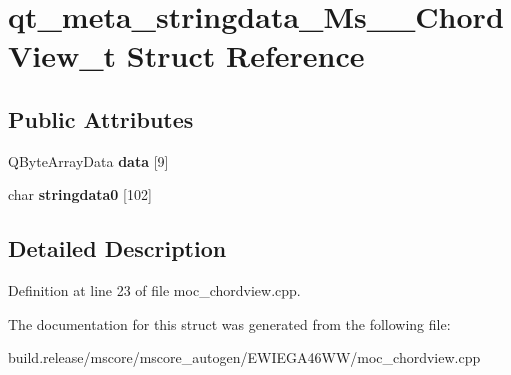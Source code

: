 \hypertarget{structqt__meta__stringdata___ms_____chord_view__t}{}\section{qt\+\_\+meta\+\_\+stringdata\+\_\+\+Ms\+\_\+\+\_\+\+Chord\+View\+\_\+t Struct Reference}
\label{structqt__meta__stringdata___ms_____chord_view__t}
\subsection*{Public Attributes}
\begin{DoxyCompactItemize}
\item 
\mbox{\label{structqt__meta__stringdata___ms_____chord_view__t_a2c904f8327f80674de788ad21fb78b24}} 
Q\+Byte\+Array\+Data {\bfseries data} \mbox{[}9\mbox{]}
\item 
\mbox{\label{structqt__meta__stringdata___ms_____chord_view__t_a56243e898504516771abb5654b6fd5ca}} 
char {\bfseries stringdata0} \mbox{[}102\mbox{]}
\end{DoxyCompactItemize}


\subsection{Detailed Description}


Definition at line 23 of file moc\+\_\+chordview.\+cpp.



The documentation for this struct was generated from the following file\+:\begin{DoxyCompactItemize}
\item 
build.\+release/mscore/mscore\+\_\+autogen/\+E\+W\+I\+E\+G\+A46\+W\+W/moc\+\_\+chordview.\+cpp\end{DoxyCompactItemize}
